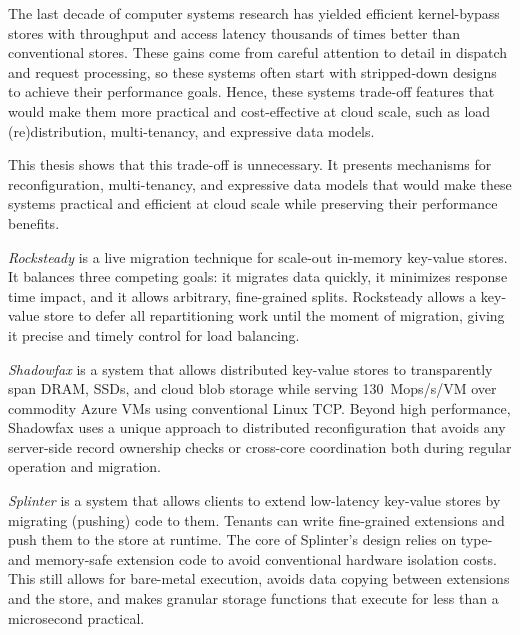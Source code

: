 The last decade of computer systems research has yielded efficient
kernel-bypass stores with throughput and access latency thousands
of times better than conventional stores.
%
These gains come from careful attention to detail in dispatch and
request processing,
so these systems often start with stripped-down designs to
achieve their performance goals.
%
Hence, these systems trade-off
features that
would make them more practical and cost-effective at cloud scale,
such as load (re)distribution, multi-tenancy, and
expressive data models.

This thesis shows that this trade-off is unnecessary.
It presents mechanisms for
reconfiguration, multi-tenancy, and expressive data
models that
would make these systems practical and
efficient at cloud scale while preserving their performance
benefits.

\emph{Rocksteady}
is a live migration technique for scale-out
in-memory key-value stores.
%
It balances three competing goals: it
migrates data quickly, it minimizes response time impact, and it
allows arbitrary, fine-grained splits.
%
Rocksteady allows a key-value store to defer all repartitioning work
until the moment of migration, giving it precise and timely control for
load balancing.

\emph{Shadowfax} is
a system that
allows distributed key-value stores to
transparently span DRAM, SSDs, and cloud blob storage while serving
130~Mops/s/VM over commodity Azure VMs using conventional Linux TCP.
%
Beyond
high performance, Shadowfax uses a unique approach to distributed
reconfiguration that avoids any server-side record ownership checks
or cross-core coordination both during regular operation and migration.

\emph{Splinter} is a system that
allows clients
to extend low-latency key-value stores by migrating (pushing) code to them.
%
Tenants can write
fine-grained extensions and push
them to the store at runtime.
%
The core of
Splinter's design relies on type- and memory-safe
extension code to avoid conventional hardware isolation costs.
%
This
still allows for bare-metal execution, avoids data copying between
extensions and the store, and makes granular storage functions that
execute for less than
a microsecond practical.
